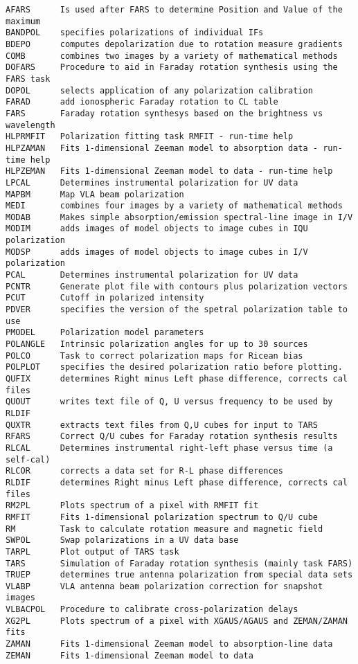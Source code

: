 \vskip 0.5pt
\bbve\begin{verbatim}
AFARS      Is used after FARS to determine Position and Value of the maximum
BANDPOL    specifies polarizations of individual IFs
BDEPO      computes depolarization due to rotation measure gradients
COMB       combines two images by a variety of mathematical methods
DOFARS     Procedure to aid in Faraday rotation synthesis using the FARS task
DOPOL      selects application of any polarization calibration
FARAD      add ionospheric Faraday rotation to CL table
FARS       Faraday rotation synthesys based on the brightness vs wavelength
HLPRMFIT   Polarization fitting task RMFIT - run-time help
HLPZAMAN   Fits 1-dimensional Zeeman model to absorption data - run-time help
HLPZEMAN   Fits 1-dimensional Zeeman model to data - run-time help
LPCAL      Determines instrumental polarization for UV data
MAPBM      Map VLA beam polarization
MEDI       combines four images by a variety of mathematical methods
MODAB      Makes simple absorption/emission spectral-line image in I/V
MODIM      adds images of model objects to image cubes in IQU polarization
MODSP      adds images of model objects to image cubes in I/V polarization
PCAL       Determines instrumental polarization for UV data
PCNTR      Generate plot file with contours plus polarization vectors
PCUT       Cutoff in polarized intensity
PDVER      specifies the version of the spetral polarization table to use
PMODEL     Polarization model parameters
POLANGLE   Intrinsic polarization angles for up to 30 sources
POLCO      Task to correct polarization maps for Ricean bias
POLPLOT    specifies the desired polarization ratio before plotting.
QUFIX      determines Right minus Left phase difference, corrects cal files
QUOUT      writes text file of Q, U versus frequency to be used by RLDIF
QUXTR      extracts text files from Q,U cubes for input to TARS
RFARS      Correct Q/U cubes for Faraday rotation synthesis results
RLCAL      Determines instrumental right-left phase versus time (a self-cal)
RLCOR      corrects a data set for R-L phase differences
RLDIF      determines Right minus Left phase difference, corrects cal files
RM2PL      Plots spectrum of a pixel with RMFIT fit
RMFIT      Fits 1-dimensional polarization spectrum to Q/U cube
RM         Task to calculate rotation measure and magnetic field
SWPOL      Swap polarizations in a UV data base
TARPL      Plot output of TARS task
TARS       Simulation of Faraday rotation synthesis (mainly task FARS)
TRUEP      determines true antenna polarization from special data sets
VLABP      VLA antenna beam polarization correction for snapshot images
VLBACPOL   Procedure to calibrate cross-polarization delays
XG2PL      Plots spectrum of a pixel with XGAUS/AGAUS and ZEMAN/ZAMAN fits
ZAMAN      Fits 1-dimensional Zeeman model to absorption-line data
ZEMAN      Fits 1-dimensional Zeeman model to data
\end{verbatim}\eve

